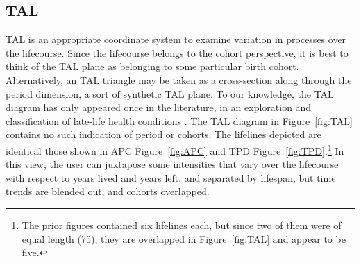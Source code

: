 \documentclass[11pt,oneside,a4paper]{article} %
\newcommand\tgh[1]{\raisebox{-.25\height}{\texttt{[image: Figures/triadtable/triad\#1.pdf]}}}
\begin{document}
\subsection*{TAL}%
\FloatBarrier
TAL is an appropriate coordinate
system to examine variation in processes over the lifecourse. Since
the lifecourse belongs to the cohort perspective, it is best to think of the TAL
plane as belonging to some particular birth cohort. Alternatively, an TAL
triangle may be taken as a cross-section along through the period dimension, a
sort of synthetic TAL plane. To our knowledge, the TAL diagram has only appeared
once in the literature, in an exploration and classification of late-life health
conditions \citep{riffe2015ttd}. The TAL diagram in Figure~\ref{fig:TAL}
contains no such indication of period or cohorts. The
lifelines depicted are identical those shown in APC Figure~\ref{fig:APC} and
TPD Figure~\ref{fig:TPD}.\footnote{The prior figures contained six lifelines
each, but since two of them were of equal length (75), they are overlapped in
Figure~\ref{fig:TAL} and appear to be five.} In this view, the user can
juxtapose some intensities that vary over the lifecourse with respect to years
lived and years left, and separated by lifespan, but time trends are blended
out, and cohorts overlapped.
\end{document}
